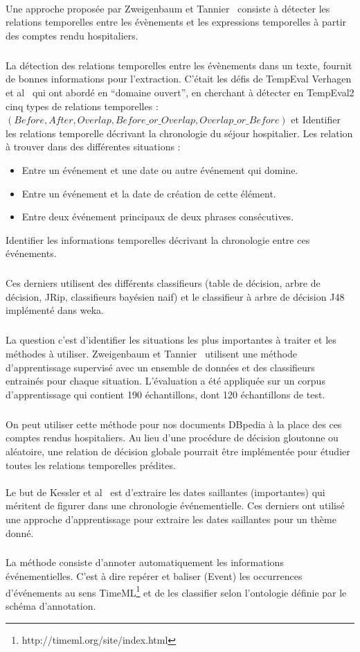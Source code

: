 \documentclass[12pt,a4	]{report}
\begin{document}
\paragraph{}
Une approche proposée par Zweigenbaum et Tannier~\cite{zweigenbaum2013} consiste à détecter les relations temporelles entre les évènements et les expressions temporelles à partir des comptes rendu hospitaliers.
\subparagraph{}
La détection des relations temporelles entre les évènements dans un texte, fournit de bonnes informations pour l’extraction.
\newline
C’était les défis de TempEval Verhagen et al~\cite{verhagen2010} qui ont abordé en “domaine ouvert”, en cherchant à détecter en TempEval2 cinq types de relations temporelles :
\newline
$(Before, After, Overlap, Before\_or\_Overlap, Overlap\_or\_Before)$
et Identifier les relations temporelle décrivant la chronologie du séjour hospitalier.
\newline
Les relation à trouver dans des différentes situations :
\begin{itemize}
\item{}Entre un événement et une date ou autre événement qui domine.
\item{}Entre un événement et la date de création de cette élément.
\item{}Entre deux événement principaux de deux phrases consécutives.
\end{itemize}
Identifier les informations temporelles décrivant la chronologie entre ces événements.
\subparagraph{}
Ces derniers utilisent des différents classifieurs (table de décision, arbre de décision, JRip, classifieurs bayésien naif) et le classifieur à arbre de décision J48 implémenté dans weka.
\subparagraph{}
La question c’est d’identifier les situations les plus importantes à traiter et les méthodes à utiliser.
Zweigenbaum et Tannier~\cite{zweigenbaum2013} utilisent une méthode d’apprentissage supervisé avec un ensemble de données et des classifieurs entrainés pour chaque situation. 
L'évaluation a été appliquée sur un corpus d’apprentissage qui contient 190 échantillons, dont 120 échantillons de test.
\subparagraph{}
On peut utiliser cette méthode pour nos documents DBpedia à la place des ces comptes rendus hospitaliers.
Au lieu d’une procédure de décision gloutonne ou aléatoire, une relation de décision globale pourrait être implémentée pour étudier toutes les relations temporelles prédites. 
\paragraph{}
Le but de Kessler et al~\cite{kessler2013} est d'extraire les dates saillantes (importantes) qui méritent de figurer dans une chronologie événementielle.
Ces derniers ont utilisé une approche d’apprentissage pour extraire les dates saillantes pour un thème donné.
\subparagraph{}
La méthode consiste d'annoter automatiquement les informations événementielles. C’est à dire repérer et baliser (Event) les occurrences d’événements au sens TimeML\footnote{http://timeml.org/site/index.html} et de les classifier selon l’ontologie définie par le schéma d’annotation. 
\end{document}
